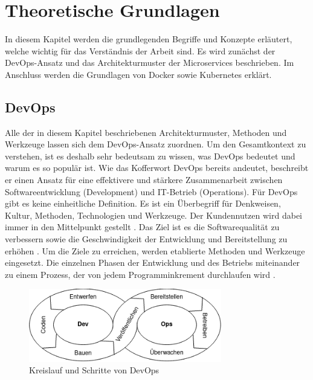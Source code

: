\section{Theoretische Grundlagen}

In diesem Kapitel werden die grundlegenden Begriffe und Konzepte erläutert, welche wichtig für das Verständnis der Arbeit sind. Es wird zunächst der DevOps-Ansatz und das Architekturmuster der Microservices beschrieben. Im Anschluss werden die Grundlagen von Docker sowie Kubernetes erklärt.

\subsection{DevOps}

Alle der in diesem Kapitel beschriebenen Architekturmuster, Methoden und Werkzeuge lassen sich dem DevOps-Ansatz zuordnen. Um den Gesamtkontext zu verstehen, ist es deshalb sehr bedeutsam zu wissen, was DevOps bedeutet und warum es so populär ist. Wie das Kofferwort \glqq DevOps\grqq{} bereits andeutet, beschreibt er einen Ansatz für eine effektivere und stärkere Zusammenarbeit zwischen Softwareentwicklung (Development) und IT-Betrieb (Operations). Für DevOps gibt es keine einheitliche Definition. Es ist ein Überbegriff für Denkweisen, Kultur, Methoden, Technologien und Werkzeuge. Der Kundennutzen wird dabei immer in den Mittelpunkt gestellt \parencite[vgl.][S. 1]{halstenbergDevOps2020}. Das Ziel ist es die Softwarequalität zu verbessern sowie die Geschwindigkeit der Entwicklung und Bereitstellung zu erhöhen \parencite[vgl.][S. 6]{arundelCloud2019}. Um die Ziele zu erreichen, werden etablierte Methoden und Werkzeuge eingesetzt. Die einzelnen Phasen der Entwicklung und des Betriebs miteinander zu einem Prozess, der von jedem Programminkrement durchlaufen wird \parencite[vgl.][S. 63]{trempArchitekturen2021}.

\begin{figure}[H] 
    \centering
    \includegraphics[width=0.75\textwidth]{figures/DevOpsKreislauf.png}
    \caption{Kreislauf und Schritte von DevOps \parencite[vgl.][S. 63]{trempArchitekturen2021}}
\end{figure}

